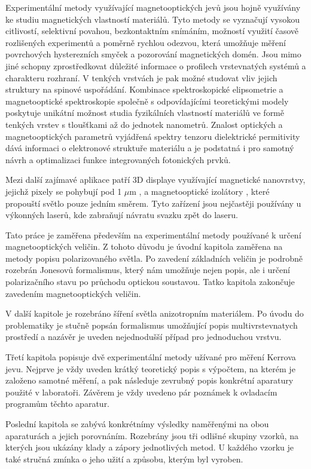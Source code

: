 Experimentální metody využívající magnetooptických jevů jsou hojně využívány ke studiu 
magnetických vlastností materiálů.  Tyto metody se vyznačují vysokou citlivostí, 
selektivní povahou, bezkontaktním snímáním, možností využití časově rozlišených experimentů 
a poměrně rychlou odezvou, která umožňuje měření povrchových hysterezních smyček a pozorování 
magnetických domén. Jsou mimo jiné schopny zprostředkovat důležité informace o profilech 
vrstevnatých systémů a charakteru rozhraní. V tenkých vrstvách je pak možné studovat vliv 
jejich struktury na spinové uspořádání. Kombinace spektroskopické elipsometrie a 
magnetooptické spektroskopie společně s odpovídajícími teoretickými modely poskytuje unikátní 
možnost studia fyzikálních vlastností materiálů ve formě tenkých vrstev s tloušťkami až do 
jednotek nanometrů. Znalost optických a magnetooptických parametrů vyjádřená spektry tenzoru 
dielektrické permitivity dává informaci o elektronové struktuře materiálu a je podstatná 
i pro samotný návrh a optimalizaci funkce integrovaných fotonických prvků.

Mezi další zajímavé aplikace patří 3D displaye využívající magnetické nanovrstvy, jejichž pixely se pohybují pod 1 $\mu$m \cite{3D disp}, 
a magnetooptické izolátory \cite{izolatory}, které propouští světlo pouze jedním směrem. Tyto zařízení jsou nejčastěji používány u výkonných 
laserů, kde zabraňují návratu svazku zpět do laseru.

Tato práce je zaměřena především na experimentální metody používané k určení magnetooptických veličin. Z tohoto důvodu 
je úvodní kapitola zaměřena na metody popisu polarizovaného světla. Po zavedení základních veličin je podrobně rozebrán Jonesovů formalismus, 
který nám umožňuje nejen popis, ale i určení polarizačního stavu po průchodu optickou soustavou. Tatko kapitola zakončuje zavedením magnetooptických veličin.

V další kapitole je rozebráno šíření světla anizotropním materiálem. Po úvodu do problematiky je stučně popsán formalismus umožňující popis multivrstevnatych 
prostředí a nazávěr je uveden nejednodušší případ pro jednoduchou vrstvu.

Třetí kapitola popisuje dvě experimentální metody užívané pro měření Kerrova jevu. Nejprve je vždy uveden krátký teoretický popis s 
výpočtem, na kterém je založeno samotné měření, a pak následuje zevrubný popis konkrétní aparatury použité v laboratoři. Závěrem je vždy uvedeno pár 
poznámek k ovladacím programům těchto aparatur.

Poslední kapitola se zabývá konkrétnímy výsledky naměřenými na obou aparaturách a jejich porovnáním. Rozebrány jsou tři odlišné skupiny vzorků, 
na kterých jsou ukázány klady a zápory jednotlivých metod. U každého vzorku je také stručná zmínka o jeho užití a způsobu, kterým byl vyroben.
